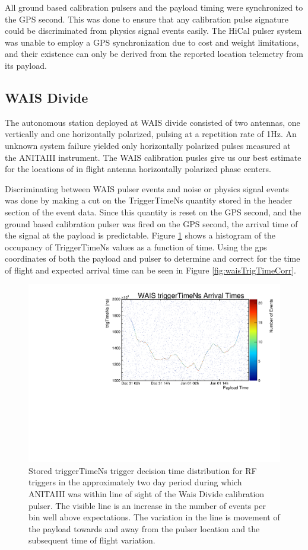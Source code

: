 	All ground based calibration pulsers and the payload timing were synchronized to the GPS second.  This was done to ensure that any calibration pulse signature could be discriminated from physics signal events easily.  The HiCal pulser system was unable to employ a GPS synchronization due to cost and weight limitations, and their existence can only be derived from the reported location telemetry from its payload.
	
	\subsection{WAIS Divide}
		The autonomous station deployed at WAIS divide consisted of two antennas, one vertically and one horizontally polarized, pulsing at a repetition rate of 1Hz.  An unknown system failure yielded only horizontally polarized pulses measured at the ANITAIII instrument.  The WAIS calibration pusles give us our best estimate for the locations of in flight antenna horizontally polarized phase centers.
		
		Discriminating between WAIS pulser events and noise or physics signal events was done by making a cut on the TriggerTimeNs quantity stored in the header section of the event data.  Since this quantity is reset on the GPS second, and the ground based calibration pulser was fired on the GPS second, the arrival time of the signal at the payload is predictable.  Figure \ref{fig:waisTrigTimeNs} shows a histogram of the occupancy of TriggerTimeNs values as a function of time.  Using the gps coordinates of both the payload and pulser to determine and correct for the time of flight and expected arrival time can be seen in Figure \ref{fig:waisTrigTimeCorr}.
		
	\begin{figure}
		\includegraphics[width=\textwidth]{figures/waisTrigTimeNs}
		\caption{Stored triggerTimeNs trigger decision time distribution for RF triggers in the approximately two day period during which ANITAIII was within line of sight of the Wais Divide calibration pulser.  The visible line is an increase in the number of events per bin well above expectations.  The variation in the line is movement of the payload towards and away from the pulser location and the subsequent time of flight variation.}
		\label{fig:waisTrigTimeNs}
	\end{figure}		

